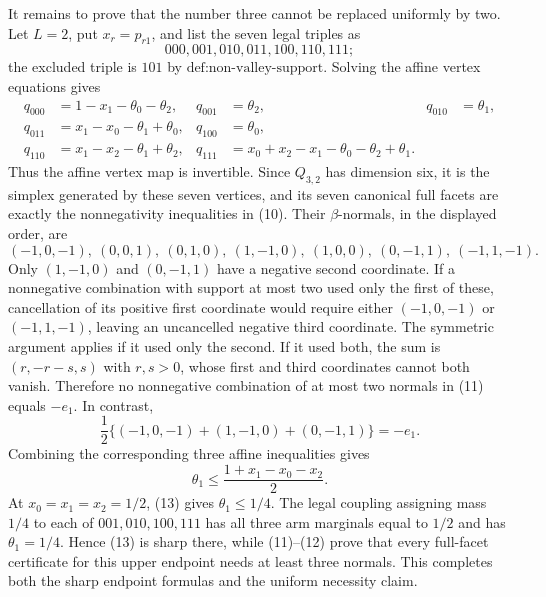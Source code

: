 It remains to prove that the number three cannot be replaced uniformly by two.  Let \(L=2\), put \(x_r=p_{r1}\), and list the seven legal triples as
\[
 000,001,010,011,100,110,111;
\]
the excluded triple is \(101\) by \(\text{def:non-valley-support}\).  Solving the affine vertex equations gives
\[
\begin{aligned}
 q_{000}&=1-x_1-\theta_0-\theta_2,&
 q_{001}&=\theta_2,&
 q_{010}&=\theta_1,\\
 q_{011}&=x_1-x_0-\theta_1+\theta_0,&
 q_{100}&=\theta_0,\\
 q_{110}&=x_1-x_2-\theta_1+\theta_2,&
 q_{111}&=x_0+x_2-x_1-\theta_0-\theta_2+\theta_1.
\end{aligned}                                                                  \tag{10}
\]
Thus the affine vertex map is invertible.  Since \(Q_{3,2}\) has dimension six, it is the simplex generated by these seven vertices, and its seven canonical full facets are exactly the nonnegativity inequalities in (10).  Their \(\beta\)-normals, in the displayed order, are
\[
 (-1,0,-1),\ (0,0,1),\ (0,1,0),\ (1,-1,0),\ (1,0,0),\ (0,-1,1),\ (-1,1,-1). \tag{11}
\]
Only \((1,-1,0)\) and \((0,-1,1)\) have a negative second coordinate.  If a nonnegative combination with support at most two used only the first of these, cancellation of its positive first coordinate would require either \((-1,0,-1)\) or \((-1,1,-1)\), leaving an uncancelled negative third coordinate.  The symmetric argument applies if it used only the second.  If it used both, the sum is \((r,-r-s,s)\) with \(r,s>0\), whose first and third coordinates cannot both vanish.  Therefore no nonnegative combination of at most two normals in (11) equals \(-e_1\).  In contrast,
\[
 \frac12\bigl\{(-1,0,-1)+(1,-1,0)+(0,-1,1)\bigr\}=-e_1.                    \tag{12}
\]
Combining the corresponding three affine inequalities gives
\[
 \theta_1\leq\frac{1+x_1-x_0-x_2}{2}.                                      \tag{13}
\]
At \(x_0=x_1=x_2=1/2\), (13) gives \(\theta_1\leq1/4\).  The legal coupling assigning mass \(1/4\) to each of \(001,010,100,111\) has all three arm marginals equal to \(1/2\) and has \(\theta_1=1/4\).  Hence (13) is sharp there, while (11)--(12) prove that every full-facet certificate for this upper endpoint needs at least three normals.  This completes both the sharp endpoint formulas and the uniform necessity claim.

